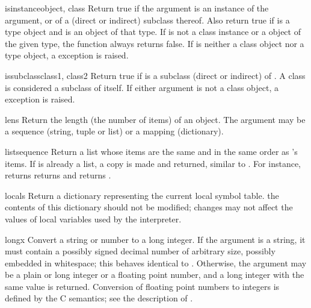 \begin{funcdesc}{isinstance}{object, class}
Return true if the  argument is an instance of the
 argument, or of a (direct or indirect) subclass thereof.
Also return true if  is a type object and  is
an object of that type.  If  is not a class instance or a
object of the given type, the function always returns false.  If
 is neither a class object nor a type object, a
 exception is raised.
\end{funcdesc}

\begin{funcdesc}{issubclass}{class1, class2}
Return true if  is a subclass (direct or indirect) of
.  A class is considered a subclass of itself.  If either
argument is not a class object, a  exception is
raised.
\end{funcdesc}

\begin{funcdesc}{len}{s}
  Return the length (the number of items) of an object.  The argument
  may be a sequence (string, tuple or list) or a mapping (dictionary).
\end{funcdesc}

\begin{funcdesc}{list}{sequence}
Return a list whose items are the same and in the same order as
's items.  If  is already a list,
a copy is made and returned, similar to .  
For instance,  returns
returns \code{['a', 'b', 'c']} and  returns
\code{[1, 2, 3]}.
\end{funcdesc}

\begin{funcdesc}{locals}{}
Return a dictionary representing the current local symbol table.
 the contents of this dictionary should not be
modified; changes may not affect the values of local variables used by 
the interpreter.
\end{funcdesc}

\begin{funcdesc}{long}{x}
  Convert a string or number to a long integer.  If the argument is a
  string, it must contain a possibly signed decimal number of
  arbitrary size, possibly embedded in whitespace;
  this behaves identical to .
  Otherwise, the argument may be a plain or
  long integer or a floating point number, and a long integer with
  the same value is returned.    Conversion of floating
  point numbers to integers is defined by the C semantics;
  see the description of .
\end{funcdesc}

